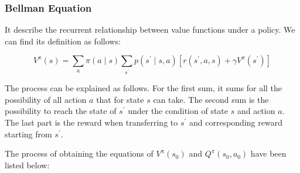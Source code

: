 \documentclass[11pt]{article}
\begin{document}
\subsubsection{Bellman Equation}
It describe the recurrent relationship between value functions under a policy. We can find its definition as follows:

$$V^{\pi}(s)=\sum_{a} \pi(a \mid s) \sum_{s^{'}}p(s^{'}\mid s,a)\left[r(s^{'},a,s)+\gamma V^{\pi}(s^{'})\right]$$

The process can be explained as follows. For the first sum, it sums for all the possibility of all action $a$ that for state $s$ can take. The second sum is the possibility to reach the state of $s^{'}$ under the condition of state $s$ and action $a$. The last part is the reward when transferring to $s^{'}$ and corresponding reward starting from $s^{'}$.

The process of obtaining the equations of $V^{\pi}(s_0)$ and $Q^{\pi}(s_0, a_0)$ have been listed below: 
\end{document}
